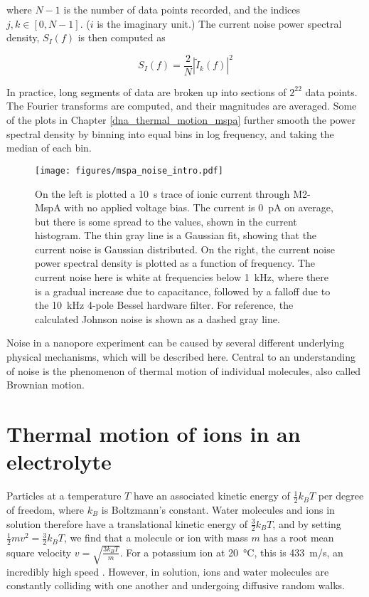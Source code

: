 \noindent
where $N-1$ is the number of data points recorded, and the indices $j, k \in [0,N-1]$.  ($i$ is the imaginary unit.)  The current noise power spectral density, $S_I(f)$ is then computed as

\begin{equation}
S_I(f) = \frac{2}{N} \left| \tilde{I}_k(f) \right| ^2
\label{eqn:power_spectrum}
\end{equation}

In practice, long segments of data are broken up into sections of $2^{22}$ data points.  The Fourier transforms are computed, and their magnitudes are averaged.  Some of the plots in Chapter \ref{dna_thermal_motion_mspa} further smooth the power spectral density by binning into equal bins in log frequency, and taking the median of each bin.

\begin{figure}[h]
\begin{centering}
\texttt{[image: figures/mspa\_noise\_intro.pdf]}
\caption[Current noise in the MspA nanopore]{On the left is plotted a \SI{10}{\s} trace of ionic current through M2-MspA with no applied voltage bias.  The current is \SI{0}{\pA} on average, but there is some spread to the values, shown in the current histogram.  The thin gray line is a Gaussian fit, showing that the current noise is Gaussian distributed.  On the right, the current noise power spectral density is plotted as a function of frequency.  The current noise here is white at frequencies below \SI{1}{\kHz}, where there is a gradual increase due to capacitance, followed by a falloff due to the \SI{10}{\kHz} 4-pole Bessel hardware filter.  For reference, the calculated Johnson noise is shown as a dashed gray line.}
\label{fig:mspa_noise_intro}
\end{centering}
\end{figure}

Noise in a nanopore experiment can be caused by several different underlying physical mechanisms, which will be described here.  Central to an understanding of noise is the phenomenon of thermal motion of individual molecules, also called Brownian motion.

\section{Thermal motion of ions in an electrolyte}

Particles at a temperature $T$ have an associated kinetic energy of $\frac{1}{2} k_B T$ per degree of freedom, where $k_B$ is Boltzmann's constant.  Water molecules and ions in solution therefore have a translational kinetic energy of $\frac{3}{2} k_B T$, and by setting $\frac{1}{2} mv^2 = \frac{3}{2} k_B T$, we find that a molecule or ion with mass $m$ has a root mean square velocity $v=\sqrt{\frac{3 k_B T}{m}}$.  For a potassium ion at \SI{20}{\celsius}, this is \SI{433}{\m/\s}, an incredibly high speed \citep{Hille2001}.  However, in solution, ions and water molecules are constantly colliding with one another and undergoing diffusive random walks.

